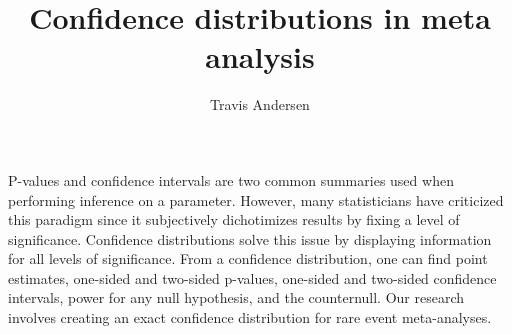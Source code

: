 \documentclass{article}
\title{Confidence distributions in meta analysis}
\author{Travis Andersen}
\begin{document}
\maketitle  

P-values and confidence intervals are two common summaries used when performing inference on a parameter. However, many statisticians have criticized this paradigm since it subjectively dichotimizes results by fixing a level of significance. Confidence distributions solve this issue by displaying information for all levels of significance. From a confidence distribution, one can find point estimates, one-sided and two-sided p-values, one-sided and two-sided confidence intervals, power for any null hypothesis, and the counternull. Our research involves creating an exact confidence distribution for rare event meta-analyses. 
\end{document}
